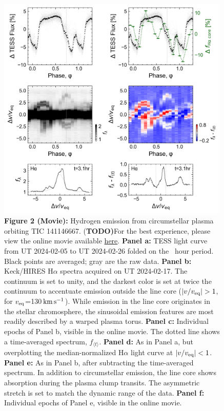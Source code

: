 \documentclass{nature3}
\newcommand{\kms}{\ensuremath{\rm km\,s^{-1}}}
\begin{document}
\begin{figure}[!tp]
  \centering
  \includegraphics[width=0.99\textwidth]{figures/f2.png}
  \caption[]{{\bf Figure 2 (Movie):}  
  Hydrogen emission from circumstellar plasma orbiting TIC 141146667.
  {(\bf TODO)}For the best experience, please view the online movie
  available
  \href{https://lgbouma.com/movies/TIC141146667_sixpanel.mp4}{here}.
  {\bf Panel a:} TESS light curve from UT 2024-02-05 to UT
  2024-02-26 folded on the \periodhr\ hour period.  Black points are
  averaged; gray are the raw data.
  {\bf Panel b:} Keck/HIRES H$\alpha$ spectra
  acquired on UT 2024-02-17.  The continuum is set to unity, and the
  darkest color is set at twice the continuum to accentuate emission
  outside the line core ($|v/v_{\rm eq}|>1$, for $v_{\rm eq}$=130\,\kms).
  While emission in the line core originates in the stellar
  chromosphere, the sinusoidal emission features are most readily
  described by a warped plasma torus.
  {\bf Panel c:} Individual epochs of Panel b, visible in the
  online movie.  The dotted line shows a time-averaged spectrum,
  $f_{\langle t \rangle}$.
  {\bf Panel d:} As in Panel a, but overplotting the
  median-normalized H$\alpha$ light curve at $|v/v_{\rm eq}|<1$.
  {\bf Panel e:} As in Panel b, after subtracting the time-averaged
  spectrum. In addition to circumstellar emission, the line core shows
  absorption during the plasma clump transits.  The asymmetric stretch
  is set to match the dynamic range of the data.
  {\bf Panel f:} Individual epochs of Panel e, visible in the online
  movie.}
  \label{fig:spec}
\end{figure}
\end{document}
